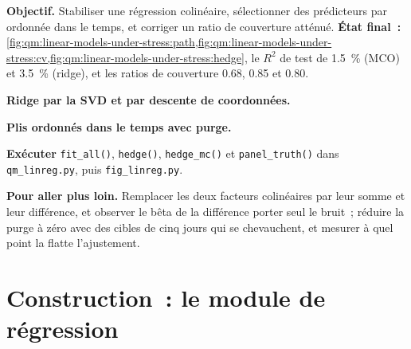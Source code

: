 \begin{tutorial}
\textbf{Objectif.} Stabiliser une régression colinéaire, sélectionner des prédicteurs par  ordonnée dans le temps, et corriger un ratio de couverture atténué.
\textbf{État final~:} \cref{fig:qm:linear-models-under-stress:path,fig:qm:linear-models-under-stress:cv,fig:qm:linear-models-under-stress:hedge}, le
$R^2$ de test de 1.5~\% (MCO) et 3.5~\% (ridge), et les ratios de couverture 0.68, 0.85 et 0.80.
\begin{tutsteps}
\item \textbf{Ridge par la SVD et  par descente de coordonnées.}
\label{lst:qm:linear-models-under-stress:enet}
\item \textbf{Plis ordonnés dans le temps avec purge.}
\label{lst:qm:linear-models-under-stress:folds}
\item \textbf{Exécuter} \texttt{fit\_all()}, \texttt{hedge()}, \texttt{hedge\_mc()} et \texttt{panel\_truth()} dans \texttt{qm\_linreg.py}, puis
\texttt{fig\_linreg.py}.
\end{tutsteps}
\textbf{Pour aller plus loin.} Remplacer les deux facteurs colinéaires par leur somme et leur différence, et observer le bêta de la différence porter seul le
bruit~; réduire la purge à zéro avec des cibles de cinq jours qui se chevauchent, et mesurer à quel point la  flatte l'ajustement.
\end{tutorial}

\section{Construction~: le module de régression}\label{bld:qm:linear-models-under-stress:linreg}

